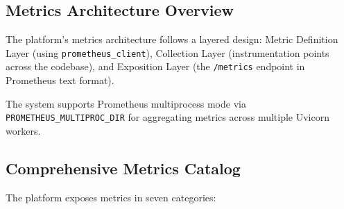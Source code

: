 \documentclass[a4paper,twoside]{sapthesis}
\begin{document}
\subsection{Metrics Architecture Overview}

The platform's metrics architecture follows a layered design: Metric Definition Layer (using \texttt{prometheus\_client}), Collection Layer (instrumentation points across the codebase), and Exposition Layer (the \texttt{/metrics} endpoint in Prometheus text format).

The system supports Prometheus multiprocess mode via \texttt{PROMETHEUS\_MULTIPROC\_DIR} for aggregating metrics across multiple Uvicorn workers.

\subsection{Comprehensive Metrics Catalog}
\label{subsec:metrics-catalog}

The platform exposes metrics in seven categories:
\end{document}
